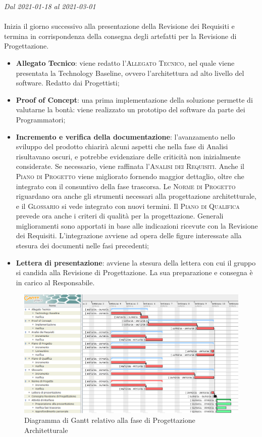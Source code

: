 \textit{Dal 2021-01-18 al 2021-03-01}
\\\\
Inizia il giorno successivo alla presentazione della Revisione dei Requisiti e termina in corrispondenza della consegna degli artefatti per la Revisione di Progettazione.
\begin{itemize}
	\item \textbf{Allegato Tecnico}: viene redatto l'\textsc{Allegato Tecnico}, nel quale viene presentata la Technology Baseline, ovvero l'architettura ad alto livello del software. Redatto dai Progettisti;
	\item \textbf{Proof of Concept}: una prima implementazione della soluzione permette di valutarne la bontà: viene realizzato un prototipo del software da parte dei Programmatori;
	\item \textbf{Incremento e verifica della documentazione}: l'avanzamento nello sviluppo del prodotto chiarirà alcuni aspetti che nella fase di Analisi risultavano oscuri, e potrebbe evidenziare delle criticità non inizialmente considerate. Se necessario, viene raffinata l'\textsc{Analisi dei Requisiti}. Anche il \textsc{Piano di Progetto} viene migliorato fornendo maggior dettaglio, oltre che integrato con il consuntivo della fase trascorsa. Le \textsc{Norme di Progetto} riguardano ora anche gli strumenti necessari alla progettazione architetturale, e il \textsc{Glossario} si vede integrato con nuovi termini. Il \textsc{Piano di Qualifica} prevede ora anche i criteri di qualità per la progettazione. Generali miglioramenti sono apportati in base alle indicazioni ricevute con la Revisione dei Requisiti. L'integrazione avviene ad opera delle figure interessate alla stesura dei documenti nelle fasi precedenti;
	\item \textbf{Lettera di presentazione}: avviene la stesura della lettera con cui il gruppo si candida alla Revisione di Progettazione. La sua preparazione e consegna è in carico al Responsabile.
\end{itemize}

\begin{figure}[H]
	\centering
	\includegraphics[scale=0.50]{res/images/03_gantt_progettazione.png}
	\caption{Diagramma di Gantt relativo alla fase di Progettazione Architetturale}
\end{figure}

